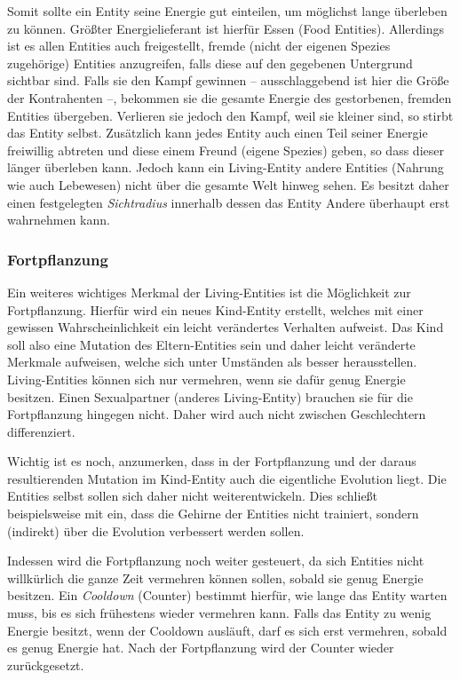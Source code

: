 \documentclass[course=erap]{aspdoc}
\begin{document}
Somit sollte ein Entity seine Energie gut einteilen, um möglichst lange überleben zu können. Größter Energielieferant ist hierfür Essen (Food Entities). Allerdings ist es allen Entities auch freigestellt, fremde (nicht der eigenen Spezies zugehörige) Entities anzugreifen, falls diese auf den gegebenen Untergrund sichtbar sind. Falls sie den Kampf gewinnen -- ausschlaggebend ist hier die Größe der Kontrahenten --, bekommen sie die gesamte Energie des gestorbenen, fremden Entities übergeben. Verlieren sie jedoch den Kampf, weil sie kleiner sind, so stirbt das Entity selbst. Zusätzlich kann jedes Entity auch einen Teil seiner Energie freiwillig abtreten und diese einem Freund (eigene Spezies) geben, so dass dieser länger überleben kann. Jedoch kann ein Living-Entity andere Entities (Nahrung wie auch Lebewesen) nicht über die gesamte Welt hinweg sehen. Es besitzt daher einen festgelegten \emph{Sichtradius} innerhalb dessen das Entity Andere überhaupt erst wahrnehmen kann.


\subsubsection{Fortpflanzung}
Ein weiteres wichtiges Merkmal der Living-Entities ist die Möglichkeit zur Fortpflanzung. Hierfür wird ein neues Kind-Entity erstellt, welches mit einer gewissen Wahrscheinlichkeit ein leicht verändertes Verhalten aufweist. Das Kind soll also eine Mutation des Eltern-Entities sein und daher leicht veränderte Merkmale aufweisen, welche sich unter Umständen als besser herausstellen. Living-Entities können sich nur vermehren, wenn sie dafür genug Energie besitzen. Einen Sexualpartner (anderes Living-Entity) brauchen sie für die Fortpflanzung hingegen nicht. Daher wird auch nicht zwischen Geschlechtern differenziert.

Wichtig ist es noch, anzumerken, dass in der Fortpflanzung und der daraus resultierenden Mutation im Kind-Entity auch die eigentliche Evolution liegt. Die Entities selbst sollen sich daher nicht weiterentwickeln. Dies schließt beispielsweise mit ein, dass die Gehirne der Entities nicht trainiert, sondern (indirekt) über die Evolution verbessert werden sollen.

Indessen wird die Fortpflanzung noch weiter gesteuert, da sich Entities nicht willkürlich die ganze Zeit vermehren können sollen, sobald sie genug Energie besitzen. Ein \emph{Cooldown} (Counter) bestimmt hierfür, wie lange das Entity warten muss, bis es sich frühestens wieder vermehren kann. Falls das Entity zu wenig Energie besitzt, wenn der Cooldown ausläuft, darf es sich erst vermehren, sobald es genug Energie hat. Nach der Fortpflanzung wird der Counter wieder zurückgesetzt.
\end{document}
